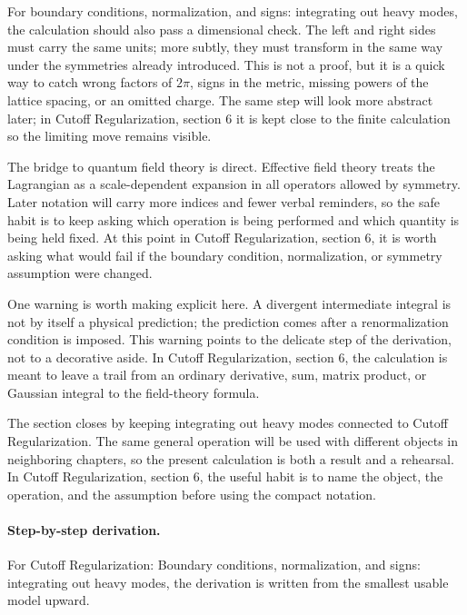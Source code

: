 For boundary conditions, normalization, and signs: integrating out heavy modes, the calculation should also pass a dimensional check.  The left and right sides must carry the same units; more subtly, they must transform in the same way under the symmetries already introduced.  This is not a proof, but it is a quick way to catch wrong factors of \(2\pi\), signs in the metric, missing powers of the lattice spacing, or an omitted charge.  The same step will look more abstract later; in Cutoff Regularization, section 6 it is kept close to the finite calculation so the limiting move remains visible.

The bridge to quantum field theory is direct.  Effective field theory treats the Lagrangian as a scale-dependent expansion in all operators allowed by symmetry.  Later notation will carry more indices and fewer verbal reminders, so the safe habit is to keep asking which operation is being performed and which quantity is being held fixed.  At this point in Cutoff Regularization, section 6, it is worth asking what would fail if the boundary condition, normalization, or symmetry assumption were changed.

One warning is worth making explicit here.  A divergent intermediate integral is not by itself a physical prediction; the prediction comes after a renormalization condition is imposed.  This warning points to the delicate step of the derivation, not to a decorative aside.  In Cutoff Regularization, section 6, the calculation is meant to leave a trail from an ordinary derivative, sum, matrix product, or Gaussian integral to the field-theory formula.

The section closes by keeping integrating out heavy modes connected to Cutoff Regularization.  The same general operation will be used with different objects in neighboring chapters, so the present calculation is both a result and a rehearsal.  In Cutoff Regularization, section 6, the useful habit is to name the object, the operation, and the assumption before using the compact notation.



\paragraph{Step-by-step derivation.}

For Cutoff Regularization: Boundary conditions, normalization, and signs: integrating out heavy modes, the derivation is written from the smallest usable model upward.

